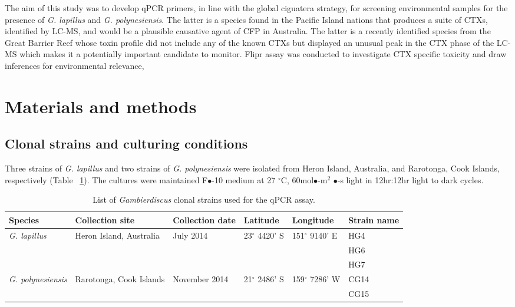 \documentclass[12pt]{article}
\begin{document}
The aim of this study was to develop qPCR primers, in line with the global ciguatera strategy, for screening environmental samples for the presence of \emph{G. lapillus} and \emph{G. polynesiensis}. The latter is a species found in the Pacific Island nations that produces a suite of CTXs, identified by LC-MS, and would be a plausible causative agent of CFP in Australia. The latter is a recently identified species from the Great Barrier Reef whose toxin profile did not include any of the known CTXs but displayed an unusual peak in the CTX phase of the LC-MS which makes it a potentially important candidate to monitor. Flipr assay was conducted to investigate CTX specific toxicity and draw inferences for environmental relevance,

\newpage
\section{Materials and methods}
\subsection{Clonal strains and culturing conditions}
Three strains of \emph{G. lapillus} and two strains of \emph{G. polynesiensis} were isolated from Heron Island, Australia, and Rarotonga, Cook Islands, respectively (Table ~\ref{tbl:StrainTable}). The cultures were maintained F$\bullet$-10 medium at 27 $^{\circ}$C, 60mol$\bullet$-m$^{2}$ $\bullet$-s light in 12hr:12hr light to dark cycles.
\FloatBarrier
\begin{table}
\caption{List of \emph{Gambierdiscus} clonal strains used for the qPCR assay.}
\label{tbl:StrainTable}
\begin{tabular}{  | p{2cm} | p{2cm} | p{2cm}| p{3cm} | p{3cm} | p{2cm} | }
\hline
\textbf{Species}  & \textbf{Collection site} &  \textbf{Collection date} &\textbf{Latitude} & \textbf{Longitude} & \textbf{Strain name} \\
  \hline
   \emph{G. lapillus}   &Heron Island, Australia &July 2014 &23$^{\circ}$ 4420' S&151$^{\circ}$ 9140' E  & HG4 \\
   \hline
&&&&& HG6\\
 \hline
 &&&& &HG7\\
 \hline
\emph{G. polynesiensis}&Rarotonga, Cook Islands&November 2014 &21$^{\circ}$ 2486' S&159$^{\circ}$ 7286' W  & CG14 \\
 \hline
&&&&&CG15\\
    \hline
 \end{tabular}
\end{table}
\end{document}
